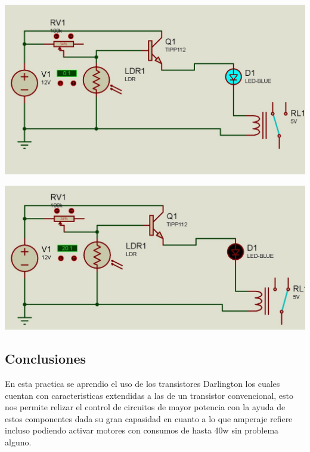 \documentclass[12pt,a4paper]{article}
\begin{document}
\begin{flushleft}
\begin{center}
\includegraphics[scale=0.25]{imagenes/circuito0.JPG} \linebreak


\includegraphics[scale=0.25]{imagenes/circuito1.JPG}
\end{center}
\end{flushleft}
\newpage
\subsection{Conclusiones}
\begin{flushleft}
En esta practica se aprendio el uso de los transistores Darlington los cuales cuentan con caracteristicas extendidas a las de un transistor convencional, esto nos permite relizar el control de circuitos de mayor potencia con la ayuda de estos componentes dada su gran capasidad en cuanto a lo que amperaje refiere incluso podiendo activar motores con consumos de hasta 40w sin problema alguno.
\end{flushleft}
\end{document}
